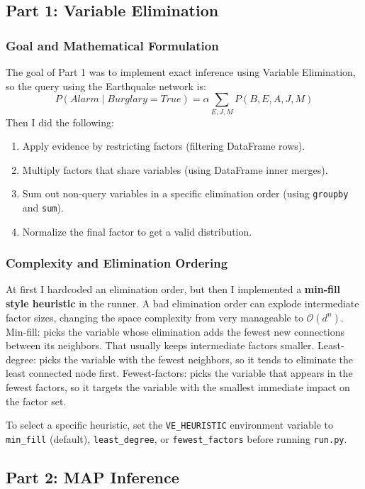 \documentclass[11pt,a4paper]{article}
\begin{document}
\subsection{Part 1: Variable Elimination}
\subsubsection{Goal and Mathematical Formulation}
The goal of Part 1 was to implement exact inference using Variable Elimination, so the query using the Earthquake network is:
\[
P(Alarm \mid Burglary=True) = \alpha \sum_{E, J, M} P(B, E, A, J, M)
\]
Then I did the following:
\begin{enumerate}
    \item Apply evidence by restricting factors (filtering DataFrame rows).
    \item Multiply factors that share variables (using DataFrame inner merges).
    \item Sum out non-query variables in a specific elimination order (using \texttt{groupby} and \texttt{sum}).
    \item Normalize the final factor to get a valid distribution.
\end{enumerate}

\subsubsection{Complexity and Elimination Ordering}
At first I hardcoded an elimination order, but then I implemented a \textbf{min-fill style heuristic} in the runner. A bad elimination order can explode intermediate factor sizes, changing the space complexity from very manageable to $\mathcal{O}(d^n)$. Min-fill: picks the variable whose elimination adds the fewest new connections between its neighbors. That usually keeps intermediate factors smaller.
Least-degree: picks the variable with the fewest neighbors, so it tends to eliminate the least connected node first.
Fewest-factors: picks the variable that appears in the fewest factors, so it targets the variable with the smallest immediate impact on the factor set.

To select a specific heuristic, set the \texttt{VE\_HEURISTIC} environment variable to \texttt{min\_fill} (default), \texttt{least\_degree}, or \texttt{fewest\_factors} before running \texttt{run.py}.

\subsection{Part 2: MAP Inference}
\end{document}
